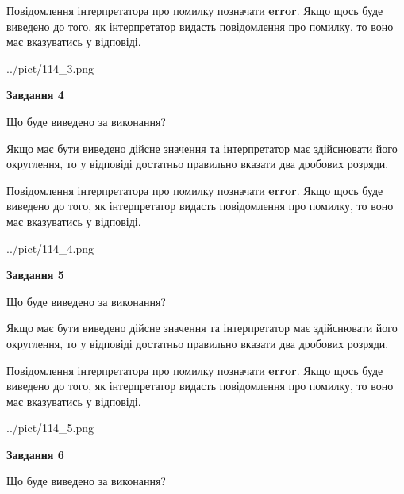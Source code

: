 \documentclass[12pt, ukrainian]{article}
\begin{document}
{\begin {Large}
Повідомлення інтерпретатора про помилку позначати \textbf{error}.
Якщо щось буде виведено до того, як інтерпретатор видасть повідомлення про помилку, 
то воно має вказуватись у відповіді. \par

\begin{center}
	{../pict/114_3.png}
\end{center}
\newpage

{\begin {center}\textbf{Завдання 4}\end {center}}\par
Що буде виведено за виконання? \par

Якщо має бути виведено дійсне значення та інтерпретатор має здійснювати його округлення, 
то у відповіді достатньо правильно вказати два дробових розряди.

Повідомлення інтерпретатора про помилку позначати \textbf{error}.
Якщо щось буде виведено до того, як інтерпретатор видасть повідомлення про помилку, 
то воно має вказуватись у відповіді. \par

\begin{center}
	{../pict/114_4.png}
\end{center}
\newpage

{\begin {center}\textbf{Завдання 5}\end {center}}\par
Що буде виведено за виконання? \par

Якщо має бути виведено дійсне значення та інтерпретатор має здійснювати його округлення, 
то у відповіді достатньо правильно вказати два дробових розряди.

Повідомлення інтерпретатора про помилку позначати \textbf{error}.
Якщо щось буде виведено до того, як інтерпретатор видасть повідомлення про помилку, 
то воно має вказуватись у відповіді. \par

\begin{center}
	{../pict/114_5.png}
\end{center}
\newpage

{\begin {center}\textbf{Завдання 6}\end {center}}\par
Що буде виведено за виконання? \par


\end{Large}}
\end{document}
